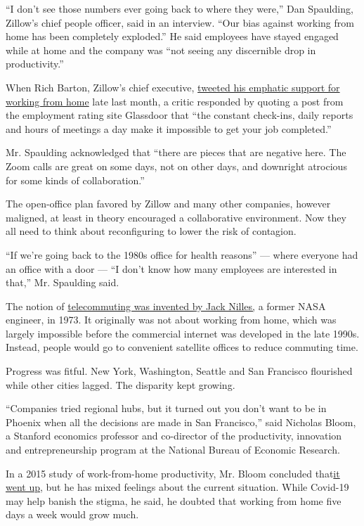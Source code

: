 ``I don't see those numbers ever going back to where they were,'' Dan
Spaulding, Zillow's chief people officer, said in an interview. ``Our
bias against working from home has been completely exploded.'' He said
employees have stayed engaged while at home and the company was ``not
seeing any discernible drop in productivity.''

When Rich Barton, Zillow's chief executive,
\href{https://twitter.com/Rich_Barton/status/1254187509459742720}{tweeted
his emphatic support for working from home} late last month, a critic
responded by quoting a post from the employment rating site Glassdoor
that ``the constant check-ins, daily reports and hours of meetings a day
make it impossible to get your job completed.''

Mr. Spaulding acknowledged that ``there are pieces that are negative
here. The Zoom calls are great on some days, not on other days, and
downright atrocious for some kinds of collaboration.''

The open-office plan favored by Zillow and many other companies, however
maligned, at least in theory encouraged a collaborative environment. Now
they all need to think about reconfiguring to lower the risk of
contagion.

``If we're going back to the 1980s office for health reasons'' --- where
everyone had an office with a door --- ``I don't know how many employees
are interested in that,'' Mr. Spaulding said.

The notion of
\href{https://www.citylab.com/life/2015/12/the-invention-of-telecommuting/418047/}{telecommuting
was invented by Jack Nilles,} a former NASA engineer, in 1973. It
originally was not about working from home, which was largely impossible
before the commercial internet was developed in the late 1990s. Instead,
people would go to convenient satellite offices to reduce commuting
time.

Progress was fitful. New York, Washington, Seattle and San Francisco
flourished while other cities lagged. The disparity kept growing.

``Companies tried regional hubs, but it turned out you don't want to be
in Phoenix when all the decisions are made in San Francisco,'' said
Nicholas Bloom, a Stanford economics professor and co-director of the
productivity, innovation and entrepreneurship program at the National
Bureau of Economic Research.

In a 2015 study of work-from-home productivity, Mr. Bloom concluded
that\href{https://www.gsb.stanford.edu/faculty-research/publications/does-working-home-work-evidence-chinese-experiment}{it
went up}, but he has mixed feelings about the current situation. While
Covid-19 may help banish the stigma, he said, he doubted that working
from home five days a week would grow much.

